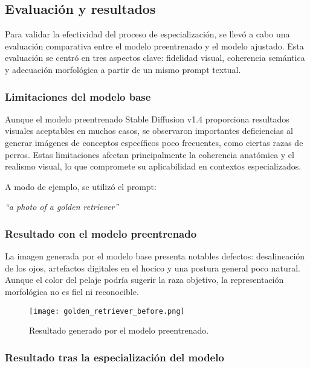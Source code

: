 \subsection{Evaluación y resultados}

Para validar la efectividad del proceso de especialización, se llevó a cabo una evaluación comparativa entre el modelo preentrenado y el modelo ajustado. Esta evaluación se centró en tres aspectos clave: fidelidad visual, coherencia semántica y adecuación morfológica a partir de un mismo prompt textual.

\subsubsection{Limitaciones del modelo base}

Aunque el modelo preentrenado Stable Diffusion v1.4 proporciona resultados visuales aceptables en muchos casos, se observaron importantes deficiencias al generar imágenes de conceptos específicos poco frecuentes, como ciertas razas de perros. Estas limitaciones afectan principalmente la coherencia anatómica y el realismo visual, lo que compromete su aplicabilidad en contextos especializados.

A modo de ejemplo, se utilizó el prompt:

\begin{center}
\textit{``a photo of a golden retriever''}
\end{center}

\subsubsection{Resultado con el modelo preentrenado}

La imagen generada por el modelo base presenta notables defectos: desalineación de los ojos, artefactos digitales en el hocico y una postura general poco natural. Aunque el color del pelaje podría sugerir la raza objetivo, la representación morfológica no es fiel ni reconocible.

\begin{figure}[H]
    \centering
    \texttt{[image: golden\_retriever\_before.png]}
    \caption{Resultado generado por el modelo preentrenado.}
    \label{fig:golden-before}
\end{figure}

\subsubsection{Resultado tras la especialización del modelo}

